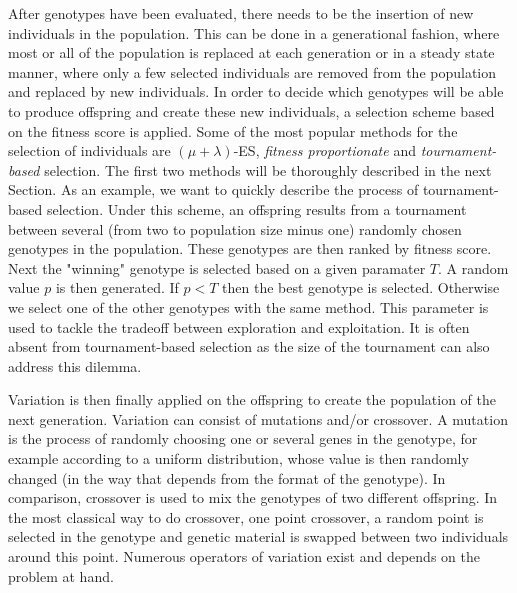     After genotypes have been evaluated, there needs to be the insertion of new individuals in the population. This can be done in a generational fashion, where most or all of the population is replaced at each generation or in a steady state manner, where only a few selected individuals are removed from the population and replaced by new individuals. In order to decide which genotypes will be able to produce offspring and create these new individuals, a selection scheme based on the fitness score is applied. Some of the most popular methods for the selection of individuals are \((\mu + \lambda)\)-ES, \emph{fitness proportionate} and \emph{tournament-based} selection. The first two methods will be thoroughly described in the next Section. As an example, we want to quickly describe the process of tournament-based selection. Under this scheme, an offspring results from a tournament between several (from two to population size minus one) randomly chosen genotypes in the population. These genotypes are then ranked by fitness score. Next the "winning" genotype is selected based on a given paramater $T$. A random value $p$ is then generated. If \(p < T\) then the best genotype is selected. Otherwise we select one of the other genotypes with the same method. This parameter is used to tackle the tradeoff between exploration and exploitation. It is often absent from tournament-based selection as the size of the tournament can also address this dilemma.

    Variation is then finally applied on the offspring to create the population of the next generation. Variation can consist of mutations and/or crossover. A mutation is the process of randomly choosing one or several genes in the genotype, for example according to a uniform distribution, whose value is then randomly changed (in the way that depends from the format of the genotype). In comparison, crossover is used to mix the genotypes of two different offspring. In the most classical way to do crossover, one point crossover, a random point is selected in the genotype and genetic material is swapped between two individuals around this point. Numerous operators of variation exist and depends on the problem at hand.


